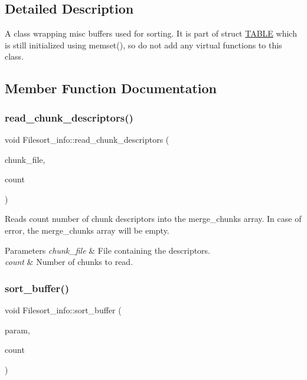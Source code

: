 \subsection{Detailed Description}
A class wrapping misc buffers used for sorting. It is part of \textquotesingle{}struct \mbox{\hyperlink{structTABLE}{T\+A\+B\+LE}}\textquotesingle{} which is still initialized using memset(), so do not add any virtual functions to this class. 

\subsection{Member Function Documentation}
\mbox{\label{classFilesort__info_a709c489a4586b82aabd8020bff21a64a}} 
\subsubsection{\texorpdfstring{read\+\_\+chunk\+\_\+descriptors()}{read\_chunk\_descriptors()}}
{\footnotesize\ttfamily void Filesort\+\_\+info\+::read\+\_\+chunk\+\_\+descriptors (\begin{DoxyParamCaption}\item[{I\+O\+\_\+\+C\+A\+C\+HE $\ast$}]{chunk\+\_\+file,  }\item[{uint}]{count }\end{DoxyParamCaption})}

Reads \textquotesingle{}count\textquotesingle{} number of chunk descriptors into the merge\+\_\+chunks array. In case of error, the merge\+\_\+chunks array will be empty. 
\begin{DoxyParams}{Parameters}
{\em chunk\+\_\+file} & File containing the descriptors. \\
\hline
{\em count} & Number of chunks to read. \\
\hline
\end{DoxyParams}
\mbox{\label{classFilesort__info_a1112e3f4717a0cc05c50c94ef3b21c1a}} 
\subsubsection{\texorpdfstring{sort\+\_\+buffer()}{sort\_buffer()}}
{\footnotesize\ttfamily void Filesort\+\_\+info\+::sort\+\_\+buffer (\begin{DoxyParamCaption}\item[{\mbox{\hyperlink{classSort__param}{Sort\+\_\+param}} $\ast$}]{param,  }\item[{uint}]{count }\end{DoxyParamCaption})\hspace{0.3cm}{\ttfamily [inline]}}


